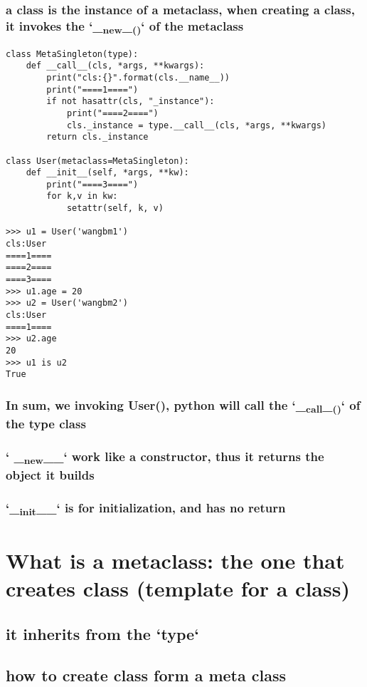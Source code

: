 \documentclass[11pt]{article}
\begin{document}
\subsubsection{a class is the instance of a metaclass, when creating a class, it invokes the `\_\textsubscript{new}\_\textsubscript{()}` of the metaclass}
\label{sec:org7f3a011}

\begin{verbatim}
class MetaSingleton(type):
    def __call__(cls, *args, **kwargs):
        print("cls:{}".format(cls.__name__))
        print("====1====")
        if not hasattr(cls, "_instance"):
            print("====2====")
            cls._instance = type.__call__(cls, *args, **kwargs)
        return cls._instance

class User(metaclass=MetaSingleton):
    def __init__(self, *args, **kw):
        print("====3====")
        for k,v in kw:
            setattr(self, k, v)

>>> u1 = User('wangbm1')
cls:User
====1====
====2====
====3====
>>> u1.age = 20
>>> u2 = User('wangbm2')
cls:User
====1====
>>> u2.age
20
>>> u1 is u2
True            
\end{verbatim}
\subsubsection{In sum, we invoking User(), python will call the `\_\textsubscript{call}\_\textsubscript{()}` of the type class}
\label{sec:orgf0ce156}
\subsubsection{` \_\textsubscript{new}\_\_` work like a constructor, thus it returns the object it builds}
\label{sec:org9fb79b1}
\subsubsection{`\_\textsubscript{init}\_\_` is for initialization, and has no return}
\label{sec:org4098289}
\section{What is a metaclass: the one that creates class (template for a class)}
\label{sec:org9e37709}
\subsection{it inherits from the `type`}
\label{sec:org22ecf8f}
\subsection{how to create class form a meta class}
\label{sec:orge4eb839}
\end{document}

